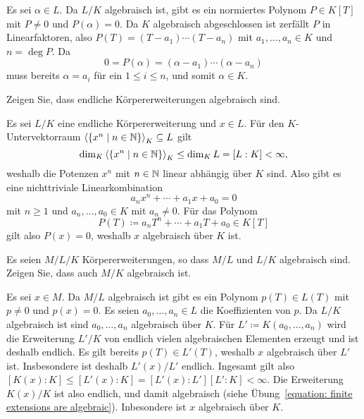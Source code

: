\begin{solution}
  Es sei $\alpha \in L$.
  Da $L/K$ algebraisch ist, gibt es ein normiertes Polynom $P \in K[T]$ mit $P \neq 0$ und $P(\alpha) = 0$.
  Da $K$ algebraisch abgeschlossen ist zerfällt $P$ in Linearfaktoren, also $P(T) = (T - a_1) \dotsm (T - a_n)$ mit $a_1, \dotsc, a_n \in K$ und $n = \deg P$.
  Da
  \[
      0
    = P(\alpha)
    = (\alpha - a_1) \dotsm (\alpha - a_n)
  \]
  muss bereits $\alpha = a_i$ für ein $1 \leq i \leq n$, und somit $\alpha \in K$.
\end{solution}


\begin{question}
  \label{equation: finite extensions are algebraic}
  Zeigen Sie, dass endliche Körpererweiterungen algebraisch sind.
\end{question}


\begin{solution}
  Es sei $L/K$ eine endliche Körpererweiterung und $x \in L$.
  Für den $K$-Untervektorraum $\left\langle  \{x^n \mid n \in \mathbb{N}\}  \right\rangle_K \subseteq L$ gilt
  \[
          \dim_K \left\langle  \{x^n \mid n \in \mathbb{N} \}  \right\rangle_K
    \leq  \dim_K L
    =     [L : K]
    <     \infty,
  \]
  weshalb die Potenzen $x^n$ mit $n \in \mathbb{N}$ linear abhängig über $K$ sind.
  Also gibt es eine nichttriviale Linearkombination
  \[
    a_n x^n + \dotsb + a_1 x + a_0 = 0
  \]
  mit $n \geq 1$ und $a_n, \dotsc, a_0 \in K$ mit $a_n \neq 0$.
  Für das Polynom
  \[
              P(T)
    \coloneqq a_n T^n + \dotsb + a_1 T + a_0
    \in       K[T]
  \]
  gilt also $P(x) = 0$, weshalb $x$ algebraisch über $K$ ist.
\end{solution}


\begin{question}
  Es seien $M / L / K$ Körpererweiterungen, so dass $M/L$ und $L/K$ algebraisch sind.
  Zeigen Sie, dass auch $M/K$ algebraisch ist.
\end{question}


\begin{question}
  Es sei $x \in M$.
  Da $M/L$ algebraisch ist gibt es ein Polynom $p(T) \in L(T)$ mit $p \neq 0$ und $p(x) = 0$.
  Es seien $a_0, \dotsc, a_n \in L$ die Koeffizienten von $p$.
  Da $L/K$ algebraisch ist sind $a_0, \dotsc, a_n$ algebraisch über $K$.
  Für $L' \coloneqq K(a_0, \dotsc, a_n)$ wird die Erweiterung $L'/K$ von endlich vielen algebraischen Elementen erzeugt und ist deshalb endlich.
  Es gilt bereits $p(T) \in L'(T)$, weshalb $x$ algebraisch über $L'$ ist.
  Insbesondere ist deshalb $L'(x)/L'$ endlich.
  Ingesamt gilt also $[K(x) : K] \leq [L'(x) : K] = [L'(x) : L'][L' : K] < \infty$.
  Die Erweiterung $K(x)/K$ ist also endlich, und damit algebraisch (siehe Übung~\ref{equation: finite extensions are algebraic}).
  Inbesondere ist $x$ algebraisch über $K$.
\end{question}


